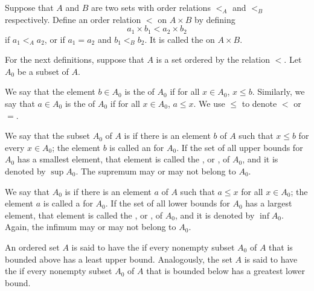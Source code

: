 \documentclass[12pt, a4paper, oneside, openright, titlepage]{book}
\begin{document}
\begin{appendices}
    \begin{definition}
        Suppose that $A$ and $B$ are two sets with order relations $<_A$ and $<_B$ respectively. Define an order relation $<$ on $A \times B$ by defining \begin{equation*}
            a_1\times b_1 < a_2\times b_2
        \end{equation*}
        if $a_1 <_A a_2$, or if $a_1 = a_2$ and $b_1 <_B b_2$. It is called the  on $A\times B$.
    \end{definition}

    
    For the next definitions, suppose that $A$ is a set ordered by the relation $<$. Let $A_0$ be a subset of $A$.


    \begin{definition}
        We say that the element $b \in A_0$ is the  of $A_0$ if for all $x \in A_0$, $x \leq b$. Similarly, we say that $a \in A_0$ is the  of $A_0$ if for all $x \in A_0$, $a \leq x$. We use $\leq$ to denote $<$ or $=$.
    \end{definition}


    \begin{definition}
        We say that the subset $A_0$ of $A$ is  if there is an element $b$ of $A$ such that $x \leq b$ for every $x \in A_0$; the element $b$ is called an  for $A_0$. If the set of all upper bounds for $A_0$ has a smallest element, that element is called the , or , of $A_0$, and it is denoted by $\sup A_0$. The supremum may or may not belong to $A_0$.
    \end{definition}


    \begin{definition}
        We say that $A_0$ is  if there is an element $a$ of $A$ such that $a \leq x$ for all $x \in A_0$; the element $a$ is called a  for $A_0$. If the set of all lower bounds for $A_0$ has a largest element, that element is called the , or , of $A_0$, and it is denoted by $\inf A_0$. Again, the infimum may or may not belong to $A_0$.
    \end{definition}


    \begin{definition}
        An ordered set $A$ is said to have the  if every nonempty subset $A_0$ of $A$ that is bounded above has a least upper bound. Analogously, the set $A$ is said to have the  if every nonempty subset $A_0$ of $A$ that is bounded below has a greatest lower bound. 


\end{definition}
\end{appendices}
\end{document}
